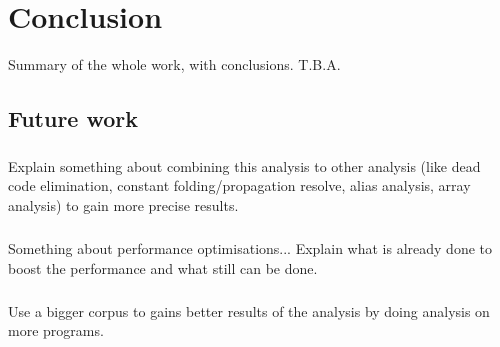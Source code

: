 \documentclass[main.tex]{subfiles}
\begin{document}
    \chapter{Conclusion}\label{chap:conclusion}
    Summary of the whole work, with conclusions. T.B.A.
    
    \section{Future work}
    
    \paragraph{}
    Explain something about combining this analysis to other analysis (like dead code elimination, constant folding/propagation resolve, alias analysis, array analysis) to gain more precise results.
    
    \paragraph{}
    Something about performance optimisations... Explain what is already done to boost the performance and what still can be done.
        
    \paragraph{}
    Use a bigger corpus to gains better results of the analysis by doing analysis on more programs.
    
\end{document}
